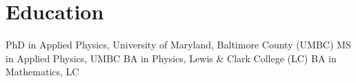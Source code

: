 %
%
%

\section{\texorpdfstring{\color{Blue}Education}{Education}}

\begin{scholarship}
					{PhD in Applied Physics, University of Maryland, Baltimore County (UMBC)}
					{MS in Applied Physics, UMBC}
					{BA in Physics, Lewis \& Clark College (LC)}
					{BA in Mathematics, LC}
\end{scholarship}
